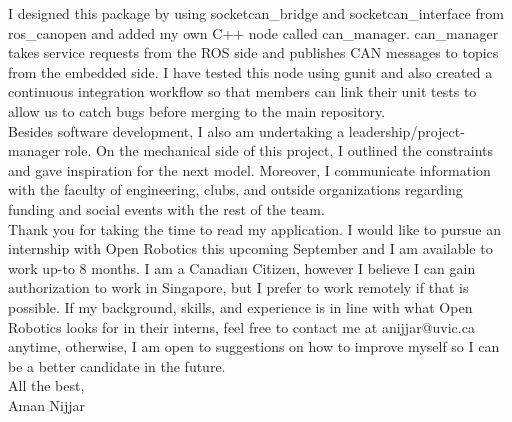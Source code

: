 \documentclass[10pt,a4paper,ragged2e,withhyper]{altacv}
\begin{document}
I designed this package by using socketcan\_bridge and socketcan\_interface from ros\_canopen and added my own C++ node called can\_manager. can\_manager takes service requests from the ROS side and publishes CAN messages to topics from the embedded side. I have tested this node using gunit and also created a continuous integration workflow so that members can link their unit tests to allow us to catch bugs before merging to the main repository.\linebreak \\

Besides software development, I also am undertaking a leadership/project-manager role. On the mechanical side of this project, I outlined the constraints and gave inspiration for the next model. Moreover, I communicate information with the faculty of engineering, clubs, and outside organizations regarding funding and social events with the rest of the team.\linebreak \\

Thank you for taking the time to read my application. I would like to pursue an internship with Open Robotics this upcoming September and I am available to work up-to 8 months. I am a Canadian Citizen, however I believe I can gain authorization to work in Singapore, but I prefer to work remotely if that is possible. If my background, skills, and experience is in line with what Open Robotics looks for in their interns, feel free to contact me at anijjar@uvic.ca anytime, otherwise, I am open to suggestions on how to improve myself so I can be a better candidate in the future. \linebreak \linebreak \\

All the best, \linebreak \linebreak \\

Aman Nijjar 
\end{document}
